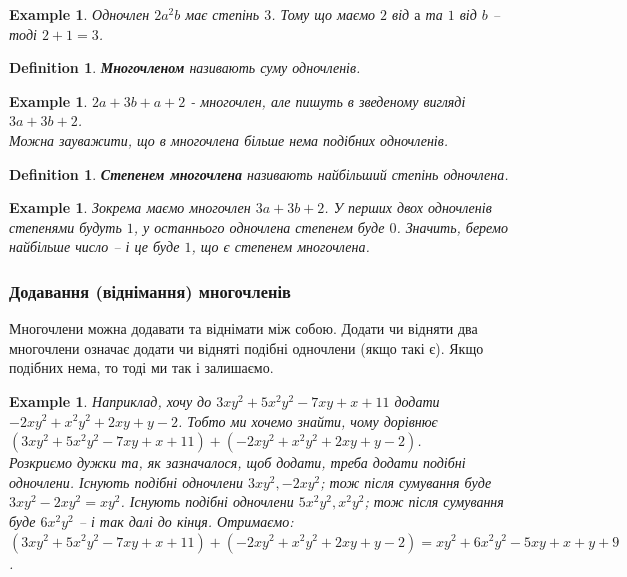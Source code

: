 \documentclass[a4paper, 10pt]{article}
\theoremstyle{theoremdd}
\theoremstyle{theoremdd}
\newtheorem{definition}[theorem]{Definition}
\theoremstyle{theoremdd}
\theoremstyle{theoremdd}
\newtheorem{example}[theorem]{Example}
\theoremstyle{theoremdd}
\theoremstyle{theoremdd}
\theoremstyle{theoremdd}
\theoremstyle{theoremdd}
\begin{document}
\begin{example}
Одночлен $2a^2b$ має степінь $3$. Тому що маємо $2$ від $а$ та $1$ від $b$ -- тоді $2 + 1 = 3$.
\end{example}

\begin{definition}
\textbf{Многочленом} називають суму одночленів.
\end{definition}

\begin{example}
$2a + 3b + a + 2$ - многочлен, але пишуть в зведеному вигляді $3a + 3b + 2$.\\
Можна зауважити, що в многочлена більше нема подібних одночленів.
\end{example}

\begin{definition}
\textbf{Степенем многочлена} називають найбільший степінь одночлена.
\end{definition}

\begin{example}
Зокрема маємо многочлен $3a + 3b + 2$. У перших двох одночленів степенями будуть $1$, у останнього одночлена степенем буде $0$. Значить, беремо найбільше число -- і це буде $1$, що є степенем многочлена.
\end{example}

\subsubsection*{Додавання (віднімання) многочленів}
Многочлени можна додавати та віднімати між собою. Додати чи відняти два многочлени означає додати чи відняті подібні одночлени (якщо такі є). Якщо подібних нема, то тоді ми так і залишаємо.

\begin{example}
Наприклад, хочу до $3xy^2 + 5x^2y^2 - 7xy + x + 11$ додати $-2xy^2 + x^2y^2 + 2xy + y -2$. Тобто ми хочемо знайти, чому дорівнює $(3xy^2 + 5x^2y^2 - 7xy + x + 11) + (-2xy^2 + x^2y^2 + 2xy + y -2)$.\\
Розкриємо дужки та, як зазначалося, щоб додати, треба додати подібні одночлени. Існують подібні одночлени $3xy^2,-2xy^2$; тож після сумування буде $3xy^2 - 2xy^2 = xy^2$. Існують подібні одночлени $5x^2y^2,x^2y^2$; тож після сумування буде $6x^2y^2$ -- і так далі до кінця. Отримаємо:\\
$(3xy^2 + 5x^2y^2 - 7xy + x + 11) + (-2xy^2 + x^2y^2 + 2xy + y -2) = xy^2 + 6x^2y^2 - 5xy + x + y + 9$.
\end{example}
\end{document}
